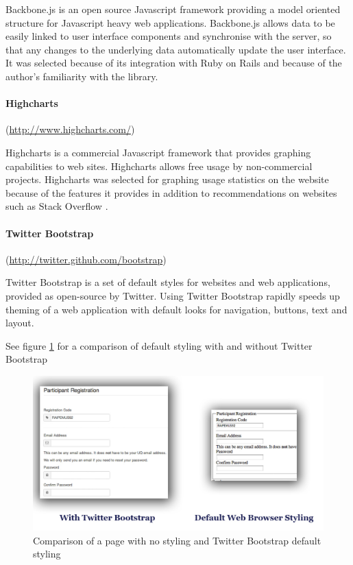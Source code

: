 Backbone.js is an open source Javascript framework providing a model oriented structure
for Javascript heavy web applications. Backbone.js allows data to be easily linked
to user interface components and synchronise with the server, so that any changes
to the underlying data automatically update the user interface. 
It was selected because of its integration with Ruby on Rails and because of the
author's familiarity with the library.

\paragraph{Highcharts}
(\url{http://www.highcharts.com/})

Highcharts is a commercial Javascript framework that provides graphing capabilities to web sites. Highcharts
allows free usage by non-commercial projects. Highcharts was selected for graphing usage statistics
on the website because of the features it provides in addition to recommendations on websites such as Stack Overflow \cite{stackoverflow_highcharts_2012}.

\paragraph{Twitter Bootstrap}
(\url{http://twitter.github.com/bootstrap})

Twitter Bootstrap is a set of default styles for websites and web applications,
provided as open-source by Twitter. Using Twitter Bootstrap rapidly speeds up theming of
a web application with default looks for navigation, buttons, text and layout.


See figure \ref{twitterbootstrap} for a comparison of default styling with and without Twitter Bootstrap
\begin{figure}[h!]
\includegraphics[width=120mm]{img/twitterbootstrap.jpg}
\caption{Comparison of a page with no styling and Twitter Bootstrap default styling}
\label{twitterbootstrap}
\end{figure}

